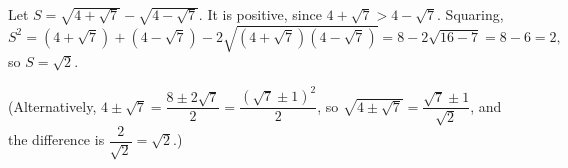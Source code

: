 Let $S=\sqrt{4+\sqrt7}-\sqrt{4-\sqrt7}$. It is positive, since $4+\sqrt7>4-\sqrt7$. Squaring,
\[
S^2=(4+\sqrt7)+(4-\sqrt7)-2\sqrt{(4+\sqrt7)(4-\sqrt7)}=8-2\sqrt{16-7}=8-6=2,
\]
so $S=\boxed{\sqrt2}$.

(Alternatively, $4\pm\sqrt7=\dfrac{8\pm2\sqrt7}{2}=\dfrac{(\sqrt7\pm1)^2}{2}$, so $\sqrt{4\pm\sqrt7}=\dfrac{\sqrt7\pm1}{\sqrt2}$, and the difference is $\dfrac{2}{\sqrt2}=\sqrt2$.)

